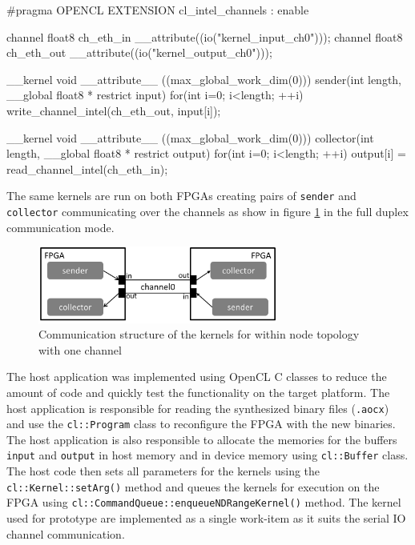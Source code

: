 \begin{CppCode} [caption=Kernels for within node prototype, frame=tlrb, label=code:within_node]
#pragma OPENCL EXTENSION cl_intel_channels : enable

channel float8 ch_eth_in __attribute((io("kernel_input_ch0")));
channel float8 ch_eth_out __attribute((io("kernel_output_ch0")));

__kernel void __attribute__ ((max_global_work_dim(0)))
sender(int length, __global float8 * restrict input)
{
    for(int i=0; i<length; ++i)
        write_channel_intel(ch_eth_out, input[i]);
}

__kernel void __attribute__ ((max_global_work_dim(0)))
collector(int length, __global float8 * restrict output)
{
    for(int i=0; i<length; ++i)
        output[i] = read_channel_intel(ch_eth_in);
}
\end{CppCode}

The same kernels are run on both FPGAs creating pairs of \texttt{sender}
and \texttt{collector} communicating over the channels as show in
figure \ref{fig:send_rcv} in the full duplex communication mode.

\begin{figure}[h]%
    \centering
    \includegraphics[width=0.7\textwidth]{images/send_recv}
    \caption{Communication structure of the kernels for within node topology with one channel}
    \label{fig:send_rcv}
\end{figure}

The host application was implemented using OpenCL C\+\+ classes to reduce the amount
of code and quickly test the functionality on the target platform. The host application
is responsible for reading the synthesized binary files (\texttt{.aocx}) and use the
\texttt{cl::Program} class to reconfigure the FPGA with the new binaries. The host application
is also responsible to allocate the memories for the buffers \texttt{input} and
\texttt{output} in host memory and in device memory using \texttt{cl::Buffer} class.
The host code then sets all parameters for the kernels using the \texttt{cl::Kernel::setArg()}
method and queues the kernels for execution on the FPGA using \texttt{cl::CommandQueue::enqueueNDRangeKernel()}
method. The kernel used for prototype are implemented as a single work-item as it suits the
serial IO channel communication.


